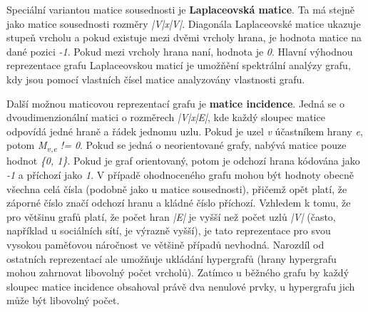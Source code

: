Speciální variantou matice sousednosti je \textbf{Laplaceovská matice}. Ta má stejně jako matice sousednosti rozměry \textit{|V|x|V|}. Diagonála Laplaceovské matice ukazuje stupeň vrcholu a pokud existuje mezi dvěmi vrcholy hrana, je hodnota matice na dané pozici \textit{-1}. Pokud mezi vrcholy hrana naní, hodnota je \textit{0}. Hlavní výhodnou reprezentace grafu Laplaceovskou maticí je umožňění spektrální analýzy grafu\cite{Barnard93}, kdy jsou pomocí vlastních čísel matice analyzovány vlastnosti grafu.

Další možnou maticovou reprezentací grafu je \textbf{matice incidence}. Jedná se o dvoudimenzionální matici o rozměrech \textit{|V|x|E|}, kde každý sloupec matice odpovídá jedné hraně a řádek jednomu uzlu. Pokud je uzel \textit{v} účastníkem hrany \textit{e}, potom \textit{M\textsubscript{v,e} != 0}. Pokud se jedná o neorientované grafy, nabývá matice pouze hodnot \textit{\{0, 1\}}. Pokud je graf orientovaný, potom je odchozí hrana kódována jako \textit{-1} a příchozí jako \textit{1}. V případě ohodnoceného grafu mohou být hodnoty obecně všechna celá čísla (podobně jako u matice sousednosti), přičemž opět platí, že záporné číslo značí odchozí hranu a kládné číslo příchozí. Vzhledem k tomu, že pro většinu grafů platí, že počet hran \textit{|E|} je vyšší než počet uzlů \textit{|V|} (často, například u sociálních sítí, je výrazně vyšší), je tato reprezentace pro svou vysokou paměťovou náročnost ve většině případů nevhodná. Narozdíl od ostatních reprezentací ale umožňuje ukládání hypergrafů (hrany hypergrafu mohou zahrnovat libovolný počet vrcholů). Zatímco u běžného grafu by každý sloupec matice incidence obsahoval právě dva nenulové prvky, u hypergrafu jich může být libovolný počet.


